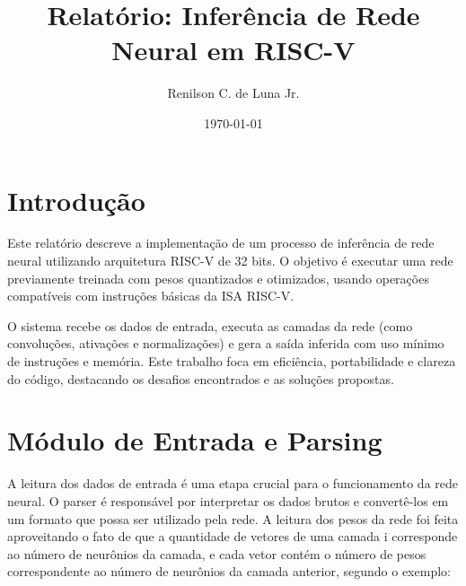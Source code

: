 \documentclass[12pt]{article}
\title{Relatório: Inferência de Rede Neural em RISC-V}
\author{Renilson C. de Luna Jr.}
\date{\today}
\begin{document}
\maketitle

\noindent
\section{Introdução}

  \hspace{2em}Este relatório descreve a implementação de um processo de inferência de rede neural utilizando arquitetura RISC-V de 32 bits. O objetivo é executar uma rede previamente treinada com pesos quantizados e otimizados, usando operações compatíveis com instruções básicas da ISA RISC-V.

  \hspace{2em}O sistema recebe os dados de entrada, executa as camadas da rede (como convoluções, ativações e normalizações) e gera a saída inferida com uso mínimo de instruções e memória. Este trabalho foca em eficiência, portabilidade e clareza do código, destacando os desafios encontrados e as soluções propostas.

\section{Módulo de Entrada e Parsing}
  \noindent
  \hspace{2em}A leitura dos dados de entrada é uma etapa crucial para o funcionamento da rede neural. O parser é responsável por interpretar os dados brutos e convertê-los em um formato que possa ser utilizado pela rede. A leitura dos pesos da rede foi feita aproveitando o fato de que a quantidade de vetores de uma camada i corresponde ao número de neurônios da camada, e cada vetor contém o número de pesos correspondente ao número de neurônios da camada anterior, segundo o exemplo: \\
\end{document}
